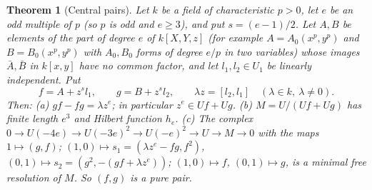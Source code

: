 \documentclass[11pt]{article}
\newtheorem{thmletter}{Theorem}
\theoremstyle{definition}
\theoremstyle{remark}
\begin{document}
\begin{thmletter}[Central pairs]\label{thm:central}
Let $k$ be a field of characteristic $p>0$, let $e$ be an odd multiple of $p$ (so $p$ is odd and $e\ge3$), and put $s=(e-1)/2$. Let $A,B$ be elements of the part of degree $e$ of $k[X,Y,z]$ (for example $A=A_0(x^p,y^p)$ and $B=B_0(x^p,y^p)$ with $A_0,B_0$ forms of degree $e/p$ in two variables) whose images $\bar A,\bar B$ in $k[x,y]$ have no common factor, and let $l_1,l_2\in U_1$ be linearly independent. Put
\[
f=A+z^sl_1,\qquad g=B+z^sl_2,\qquad\lambda z=[l_2,l_1]\quad(\lambda\in k,\ \lambda\ne0).
\]
Then: (a) $gf-fg=\lambda z^e$; in particular $z^e\in Uf+Ug$. (b) $M=U/(Uf+Ug)$ has finite length $e^3$ and Hilbert function $h_e$. (c) The complex $0\to U(-4e)\to U(-3e)^2\to U(-e)^2\to U\to M\to0$ with the maps $1\mapsto(g,f)$; $(1,0)\mapsto s_1=(\lambda z^e-fg,f^2)$, $(0,1)\mapsto s_2=(g^2,-(gf+\lambda z^e))$; $(1,0)\mapsto f$, $(0,1)\mapsto g$, is a minimal free resolution of $M$. So $(f,g)$ is a pure pair.
\end{thmletter}
\end{document}

